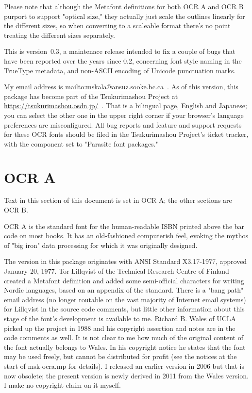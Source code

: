 \documentclass{article}
\begin{document}
Please note that although the Metafont definitions for both OCR A and OCR B
purport to support "optical size," they actually just scale the outlines
linearly for the different sizes, so when converting to a scaleable format
there's no point treating the different sizes separately.

This is version~0.3, a maintenace release intended to fix a couple of bugs
that have been reported over the years since 0.2, concerning font style
naming in the TrueType metadata, and non-ASCII encoding of Unicode
punctuation marks.

My email address is \url{mailto:mskala@ansuz.sooke.bc.ca}~.  As of this
version, this package has become part of the Tsukurimashou Project at
\url{https://tsukurimashou.osdn.jp/}~.  That is a bilingual page,
English and Japanese; you can select the other one in the upper right corner
if your browser's language preferences are misconfigured.  All bug reports
and feature and support requests for these OCR fonts should be filed in the
Tsukurimashou Project's ticket tracker, with the component set to "Parasite
font packages."

\setmainfont{OCRA.otf}
\setmonofont{OCRA.otf}
\section{OCR A}

Text in this section of this document is set in OCR A; the other sections
are OCR B.

OCR A is the standard font for the human-readable ISBN printed above the bar
code on most books.  It has an old-fashioned computerish feel, evoking the
mythos of "big iron" data processing for which it was originally designed.

The version in this package originates with ANSI Standard X3.17-1977,
approved January 20, 1977.  Tor Lillqvist of the Technical Research Centre
of Finland created a Metafont definition and added some semi-official
characters for writing Nordic languages, based on an appendix of the
standard.  There is a "bang path" email address (no longer routable on the
vast majority of Internet email systems) for Lillqvist in the source code
comments, but little other information about this stage of the font's
development is available to me.  Richard B. Wales of UCLA picked up the
project in 1988 and his copyright assertion and notes are in the code
comments as well.  It is not clear to me how much of the original content of
the font actually belongs to Wales.  In his copyright notice he states that
the font may be used freely, but cannot be distributed for profit (see the
notices at the start of msk-ocra.mp for details).
I released an earlier version in 2006
but that is now obsolete; the present version is newly derived in 2011 from
the Wales version.  I make no copyright claim on it myself.
\end{document}
